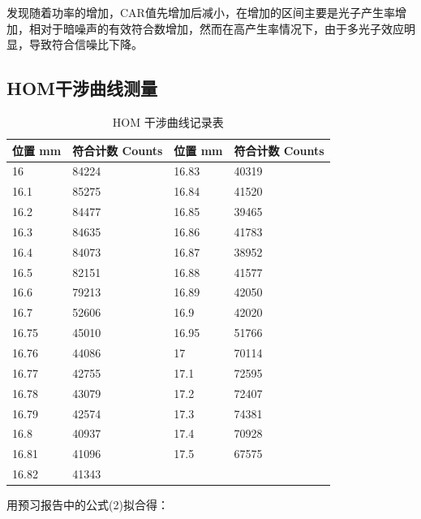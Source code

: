 \documentclass[a4paper,UTF8]{ctexart}
\begin{document}
发现随着功率的增加，CAR值先增加后减小，在增加的区间主要是光子产生率增加，相对于暗噪声的有效符合数增加，然而在高产生率情况下，由于多光子效应明显，导致符合信噪比下降。

\subsection{HOM干涉曲线测量}

\begin{table}[H]
    \centering
    \caption{HOM 干涉曲线记录表}
    \begin{tabular}{|l|l|l|l|}
    \hline
        位置 mm & 符合计数 Counts & 位置 mm & 符合计数 Counts \\ \hline
        16 & 84224 & 16.83 & 40319 \\ \hline
        16.1 & 85275 & 16.84 & 41520 \\ \hline
        16.2 & 84477 & 16.85 & 39465 \\ \hline
        16.3 & 84635 & 16.86 & 41783 \\ \hline
        16.4 & 84073 & 16.87 & 38952 \\ \hline
        16.5 & 82151 & 16.88 & 41577 \\ \hline
        16.6 & 79213 & 16.89 & 42050 \\ \hline
        16.7 & 52606 & 16.9 & 42020 \\ \hline
        16.75 & 45010 & 16.95 & 51766 \\ \hline
        16.76 & 44086 & 17 & 70114 \\ \hline
        16.77 & 42755 & 17.1 & 72595 \\ \hline
        16.78 & 43079 & 17.2 & 72407 \\ \hline
        16.79 & 42574 & 17.3 & 74381 \\ \hline
        16.8 & 40937 & 17.4 & 70928 \\ \hline
        16.81 & 41096 & 17.5 & 67575 \\ \hline
        16.82 & 41343 & & \\ \hline
    \end{tabular}
\end{table}

用预习报告中的公式(2)拟合得：
\end{document}
